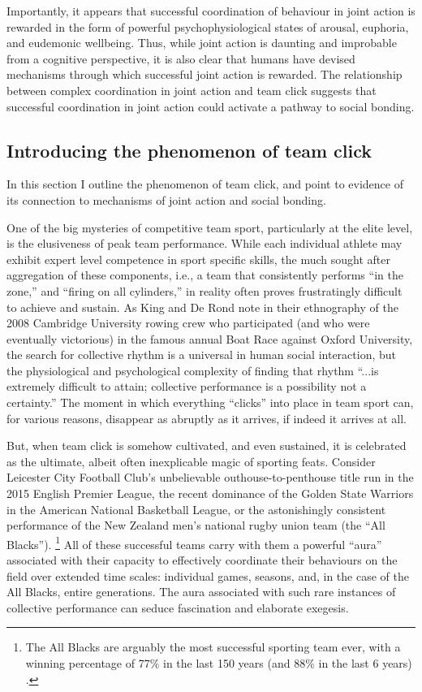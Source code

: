 \begin{CJK}{UTF8}{gbsn}
Importantly, it appears that successful coordination of behaviour in joint action is rewarded in the form of powerful psychophysiological states of arousal, euphoria, and eudemonic wellbeing.  Thus, while joint action is daunting and improbable from a cognitive perspective, it is also clear that humans have devised mechanisms through which successful joint action is rewarded. The relationship between complex coordination in joint action and team click suggests that successful coordination in joint action could activate a pathway to social bonding.

\subsection{Introducing the phenomenon of team click\label{sect:teamClickIntro}}
In this section I outline the phenomenon of team click, and point to evidence of its connection to mechanisms of joint action and social bonding.

One of the big mysteries of competitive team sport, particularly at the elite level, is the elusiveness of peak team performance.  While each individual athlete may exhibit expert level competence in sport specific skills, the much sought after aggregation of these components, i.e., a team that consistently performs ``in the zone,'' and ``firing on all cylinders,'' in reality often proves frustratingly difficult to achieve and sustain.  As King and De Rond \textcite[568]{King2011} note in their ethnography of the 2008 Cambridge University rowing crew who participated (and who were eventually victorious) in the famous annual Boat Race against Oxford University, the search for collective rhythm is a universal in human social interaction, but  the physiological and psychological complexity of finding that rhythm ``...is extremely difficult to attain; collective performance is a possibility not a certainty.''   The moment in which everything ``clicks'' into place in team sport can, for various reasons, disappear as abruptly as it arrives, if indeed it arrives at all.

But, when team click is somehow cultivated, and even sustained, it is celebrated as the ultimate, albeit often inexplicable magic of sporting feats. Consider Leicester City Football Club's unbelievable outhouse-to-penthouse title run in the 2015 English Premier League, the recent dominance of the Golden State Warriors in the American National Basketball League, or the astonishingly consistent performance of the New Zealand men's national rugby union team (the ``All Blacks'').
    \footnote{The All Blacks are arguably the most successful sporting team ever, with a winning percentage of 77\% in the last 150 years (and 88\% in the last 6 years) \citep{Kerr2013}.}
All of these successful teams carry with them a powerful ``aura'' associated with their capacity to effectively coordinate their behaviours on the field over extended time scales: individual games, seasons, and, in the case of the All Blacks, entire generations.  The aura associated with such rare instances of collective performance can seduce fascination and elaborate exegesis.


\end{CJK}
